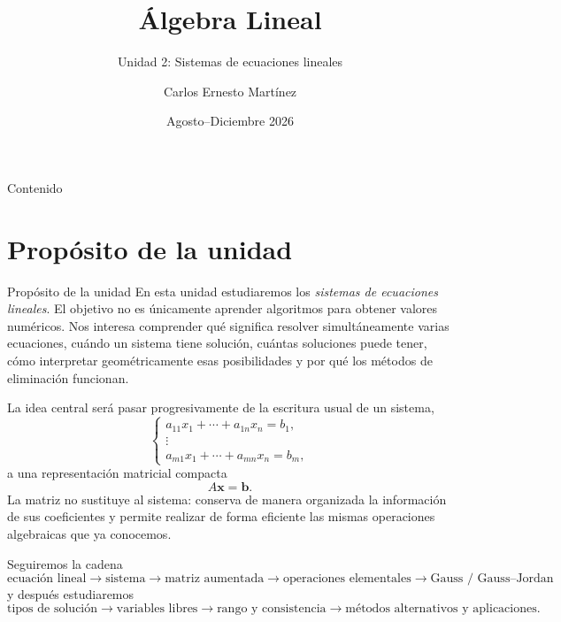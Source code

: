 \documentclass[aspectratio=169,9pt]{beamer}
\title{Álgebra Lineal}
\subtitle{Unidad 2: Sistemas de ecuaciones lineales}
\author{Carlos Ernesto Martínez}
\institute{Tecnológico Nacional de México}
\date{Agosto--Diciembre 2026}
\theoremstyle{remark}
\begin{document}
\begin{frame}\titlepage\end{frame}
\begin{frame}[allowframebreaks]{Contenido}\tableofcontents[hideallsubsections]\end{frame}
\section{Propósito de la unidad}
\begin{frame}[allowframebreaks,t]{Propósito de la unidad}
En esta unidad estudiaremos los \emph{sistemas de ecuaciones lineales}. El objetivo no es únicamente
aprender algoritmos para obtener valores numéricos. Nos interesa comprender qué significa resolver
simultáneamente varias ecuaciones, cuándo un sistema tiene solución, cuántas soluciones puede tener,
cómo interpretar geométricamente esas posibilidades y por qué los métodos de eliminación funcionan.

La idea central será pasar progresivamente de la escritura usual de un sistema,
\[
\begin{cases}
a_{11}x_1+\cdots+a_{1n}x_n=b_1,\\
\vdots\\
a_{m1}x_1+\cdots+a_{mn}x_n=b_m,
\end{cases}
\]
a una representación matricial compacta
\[
A\mathbf{x}=\mathbf{b}.
\]
La matriz no sustituye al sistema: conserva de manera organizada la información de sus coeficientes y
permite realizar de forma eficiente las mismas operaciones algebraicas que ya conocemos.

\par{}\par\smallskip
Seguiremos la cadena
\[
\boxed{\text{ecuación lineal}}
\longrightarrow
\boxed{\text{sistema}}
\longrightarrow
\boxed{\text{matriz aumentada}}
\longrightarrow
\boxed{\text{operaciones elementales}}
\longrightarrow
\boxed{\text{Gauss / Gauss--Jordan}}
\]
y después estudiaremos
\[
\boxed{\text{tipos de solución}}
\longrightarrow
\boxed{\text{variables libres}}
\longrightarrow
\boxed{\text{rango y consistencia}}
\longrightarrow
\boxed{\text{métodos alternativos y aplicaciones}}.
\]
\end{frame}
\end{document}
